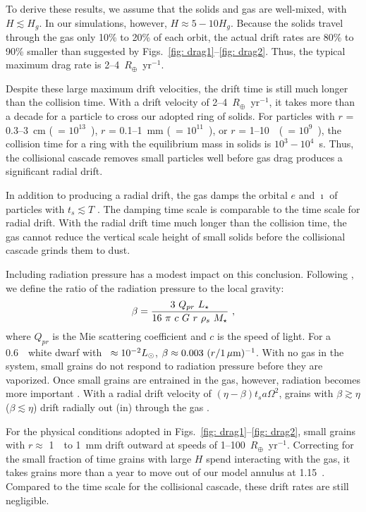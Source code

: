 \documentclass[12pt,preprint]{aastex}
\begin{document}
To derive these results, we assume that the solids and gas are well-mixed, with
$H \lesssim H_g$. In our simulations, however, $H \approx 5 - 10 H_g$. Because the
solids travel through the gas only 10\% to 20\% of each orbit, the actual drift rates 
are 80\% to 90\% smaller than suggested by Figs.~\ref{fig: drag1}--\ref{fig: drag2}.
Thus, the typical maximum drag rate is 2--4~$R_\oplus$~yr$^{-1}$.

Despite these large maximum drift velocities, the drift time is still much longer than
the collision time. With a drift velocity of 2--4~$R_\oplus$~yr$^{-1}$, it takes more
than a decade for a particle to cross our adopted ring of solids. For particles with
$r$ = 0.3--3~cm (\mdotz\ = $10^{13}$~\gs), $r$ = 0.1--1~mm (\mdotz\ = $10^{11}$~\gs), 
or $r$ = 1--10~\mum\ (\mdotz\ = $10^{9}$~\gs), the collision time for a ring with the 
equilibrium mass in solids is $10^3 - 10^4$~s. Thus, the collisional cascade removes
small particles well before gas drag produces a significant radial drift.

In addition to producing a radial drift, the gas damps the orbital $e$ and $\imath$
of particles with $t_s \lesssim T$ \citep{ada1976,weiden1977a}. The damping time scale
is comparable to the time scale for radial drift. With the radial drift time much 
longer than the collision time, the gas cannot reduce the vertical scale height of 
small solids before the collisional cascade grinds them to dust.

Including radiation pressure has a modest impact on this conclusion. Following 
\citet{burns1979}, we define the ratio of the radiation pressure to the local 
gravity:
\begin{equation}
\beta = { { 3 ~ Q_{pr} ~ \lstar } \over { 16 ~ \pi ~ c ~ G ~ r ~ \rho_s ~ \mstar } } ~ ,
\label{eq: beta}
\end{equation}
where $Q_{pr}$ is the Mie scattering coefficient and $c$ is the speed of light. 
For a 0.6~\msun\ white dwarf with \lstar\ $\approx 10^{-2} \lsun$, 
$\beta \approx 0.003 ~ (r / 1\mum)^{-1}$.  With no gas in the system, small grains 
do not respond to radiation pressure before they are vaporized. Once small grains 
are entrained in the gas, however, radiation becomes more important \citep{take2001}. 
With a radial drift velocity of $(\eta - \beta) t_s a \Omega^2$, grains with 
$\beta \gtrsim \eta$ ($\beta \lesssim \eta$) drift radially out (in) through the gas 
\citep{take2001,knb2016}.

For the physical conditions adopted in Figs.~\ref{fig: drag1}--\ref{fig: drag2},
small grains with $r \approx$ 1~\mum\ to 1~mm drift outward at speeds of 
1--100~$R_\oplus$~yr$^{-1}$.  Correcting for the small fraction of time grains 
with large $H$ spend interacting with the gas, it takes grains more than a year 
to move out of our model annulus at 1.15~\rsun.  Compared to the time scale for 
the collisional cascade, these drift rates are still negligible. 
\end{document}
